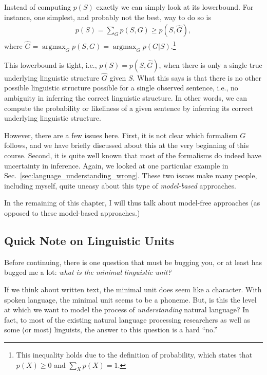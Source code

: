 \documentclass{report}
\DeclareMathOperator*{\argmax}{\arg \max}
\begin{document}
Instead of computing $p(S)$ exactly we can simply look at its lowerbound. For
instance, one simplest, and probably not the best, way to do so is
\begin{align*}
    p(S) = \sum_G p(S,G) \geq p(S, \hat{G}),
\end{align*}
where $\hat{G} = \argmax_G p(S,G) = \argmax_G p(G|S)$.\footnote{
    This inequality holds due to the definition of probability, which states
    that $p(X)\geq 0$ and $\sum_X p(X) = 1$.
}

This lowerbound is tight, i.e., $p(S) = p(S, \hat{G})$, when there is only a
single true underlying linguistic structure $\hat{G}$ given $S$. What this says
is that there is no other possible linguistic structure possible for a single
observed sentence, i.e., no ambiguity in inferring the correct linguistic
structure.  In other words, we can compute the probability or likeliness of a
given sentence by inferring its correct underlying linguistic structure.

However, there are a few issues here. First, it is not clear which formalism $G$
follows, and we have briefly discussed about this at the very beginning of this
course. Second, it is quite well known that most of the formalisms do indeed
have uncertainty in inference. Again, we looked at one particular example in
Sec.~\ref{sec:language_understanding_wrong}. These two issues make many people,
including myself, quite uneasy about this type of {\em model-based} approaches. 

In the remaining of this chapter, I will thus talk about model-free approaches
(as opposed to these model-based approaches.)

\subsection{Quick Note on Linguistic Units}
\label{sec:ling_unit}

Before continuing, there is one question that must be bugging you, or at least
has bugged me a lot: {\em what is the minimal linguistic unit?} 

If we think about written text, the minimal unit does seem like a character.
With spoken language, the minimal unit seems to be a phoneme. But, is this the
level at which we want to model the process of {\em understanding} natural
language? In fact, to most of the existing natural language processing
researchers as well as some (or most) linguists, the answer to this question is
a hard ``no.''
\end{document}
